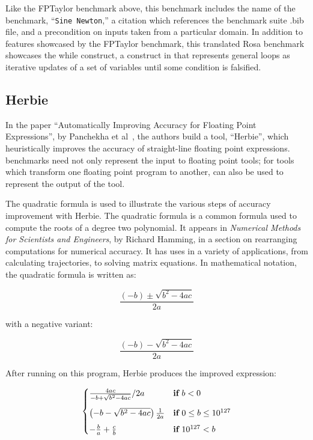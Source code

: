 \documentclass[main.tex]{subfiles}
\begin{document}
Like the FPTaylor benchmark above, this benchmark includes the name of
the benchmark, ``\verb|Sine Newton|,'' a citation which references the
benchmark suite .bib file, and a precondition on inputs taken from a
particular domain. In addition to features showcased by the FPTaylor
benchmark, this translated Rosa benchmark showcases the while
construct, a construct in \core that represents general loops as
iterative updates of a set of variables until some condition is
falsified.

\subsection{Herbie}

In the paper ``Automatically Improving Accuracy for Floating Point
Expressions'', by Panchekha et al~\cite{pavel15}, the authors build a
tool, ``Herbie'', which heuristically improves the accuracy of
straight-line floating point expressions. \name benchmarks need not
only represent the input to floating point tools; for tools which
transform one floating point program to another, \core can also be
used to represent the output of the tool.

The quadratic formula is used to illustrate the various steps of
accuracy improvement with Herbie. The quadratic formula is a common
formula used to compute the roots of a degree two polynomial. It
appears in \textit{Numerical Methods for Scientists and Engineers}, by
Richard Hamming, in a section on rearranging computations for
numerical accuracy. It has uses in a variety of applications, from
calculating trajectories, to solving matrix equations. In mathematical
notation, the quadratic formula is written as:

\begin{equation}
  \frac{(- b) \pm \sqrt{b^2 - 4ac}}{2a}
\end{equation}

with a negative variant:

\begin{equation}
  \frac{(- b) - \sqrt{b^2 - 4ac}}{2a}
\end{equation}

After running on this program, Herbie produces the improved
expression:

\newcommand{\K}[1]{\ensuremath{\mathbf{#1}}\relax\ifmmode\:\else\fi}

\[
\begin{cases}
  \frac{4ac}{-b + \sqrt{b^2 - 4ac}}/2a & \K{if} b < 0 \\[9pt]
  \left(-b - \sqrt{b^2 - 4ac}\right)\frac1{2a} & \K{if} 0 \le b \le 10^{127} \\[5pt]
  -\frac{b}{a} + \frac{c}{b} & \K{if} 10^{127} < b
\end{cases}
\]
\end{document}

